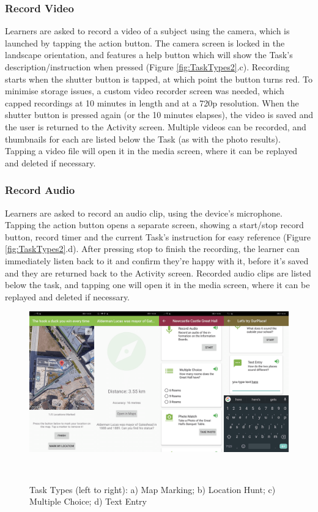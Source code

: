 \subsubsection*{Record Video}
Learners are asked to record a video of a subject using the camera, which is launched by tapping the action button. The camera screen is locked in the landscape orientation, and features a help button which will show the Task's description/instruction when pressed (Figure \ref{fig:TaskTypes2}.c). Recording starts when the shutter button is tapped, at which point the button turns red. To minimise storage issues, a custom video recorder screen was needed, which capped recordings at 10 minutes in length and at a 720p resolution. When the shutter button is pressed again (or the 10 minutes elapses), the video is saved and the user is returned to the Activity screen. Multiple videos can be recorded, and thumbnails for each are listed below the Task (as with the photo results). Tapping a video file will open it in the media screen, where it can be replayed and deleted if necessary.

\subsubsection*{Record Audio}
Learners are asked to record an audio clip, using the device's microphone. Tapping the action button opens a separate screen, showing a start/stop record button, record timer and the current Task's instruction for easy reference (Figure \ref{fig:TaskTypes2}.d). After pressing stop to finish the recording, the learner can immediately listen back to it and confirm they're happy with it, before it's saved and they are returned back to the Activity screen. Recorded audio clips are listed below the task, and tapping one will open it in the media screen, where it can be replayed and deleted if necessary.

\begin{figure}
  \centering
  \includegraphics[width=1\columnwidth]{images/chapter05/tasktypes3.png}
  \caption[Task Types (part 3)]{Task Types (left to right): a) Map Marking; b) Location Hunt; c) Multiple Choice; d) Text Entry}~\label{fig:TaskTypes3}
\end{figure}

